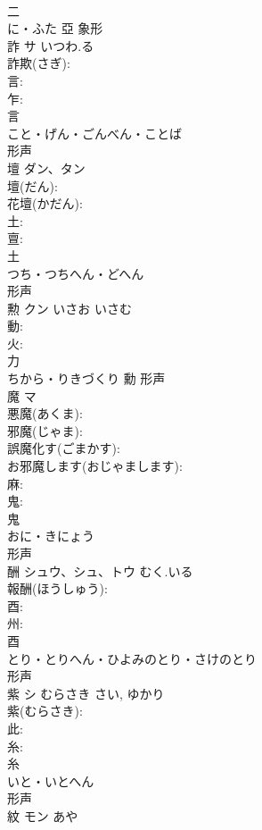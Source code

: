 \documentclass[8pt]{extreport}
\begin{document}
\begin{CJK}{UTF8}{min}
\\	二	
\\	に・ふた	亞	象形 
\\	詐	サ	いつわ.る		
\\	詐欺(さぎ): 
\\	言: 
\\	乍: 
\\	言	
\\	こと・げん・ごんべん・ことば	
\\	形声 
\\	壇	ダン、タン			
\\	壇(だん): 
\\	花壇(かだん): 
\\	土: 
\\	亶: 
\\	土	
\\	つち・つちへん・どへん	
\\	形声 
\\	勲	クン	いさお	いさむ	
\\	動: 
\\	火: 
\\	力	
\\	ちから・りきづくり	勳	形声 
\\	魔	マ			
\\	悪魔(あくま): 
\\	邪魔(じゃま): 
\\	誤魔化す(ごまかす): 
\\	お邪魔します(おじゃまします): 
\\	麻: 
\\	鬼: 
\\	鬼	
\\	おに・きにょう	
\\	形声 
\\	酬	シュウ、シュ、トウ	むく.いる		
\\	報酬(ほうしゅう): 
\\	酉: 
\\	州: 
\\	酉	
\\	とり・とりへん・ひよみのとり・さけのとり	
\\	形声 
\\	紫	シ	むらさき	さい, ゆかり	
\\	紫(むらさき): 
\\	此: 
\\	糸: 
\\	糸	
\\	いと・いとへん	
\\	形声 
\\	紋	モン		あや	

\end{CJK}
\end{document}
